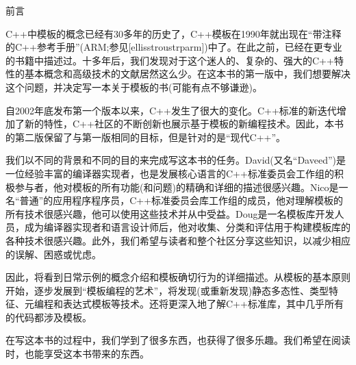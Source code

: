 
\begin{flushright}
 前言
\end{flushright}

C++中模板的概念已经有30多年的历史了，C++模板在1990年就出现在“带注释的C++参考手册”(ARM;参见[ellisstroustrparm])中了。在此之前，已经在更专业的书籍中描述过。十多年后，我们发现对于这个迷人的、复杂的、强大的C++特性的基本概念和高级技术的文献居然这么少。在这本书的第一版中，我们想要解决这个问题，并决定写一本关于模板的书(可能有点不够谦逊)。

自2002年底发布第一个版本以来，C++发生了很大的变化。C++标准的新迭代增加了新的特性，C++社区的不断创新也展示基于模板的新编程技术。因此，本书的第二版保留了与第一版相同的目标，但是针对的是“现代C++”。

我们以不同的背景和不同的目的来完成写这本书的任务。David(又名“Daveed”)是一位经验丰富的编译器实现者，也是发展核心语言的C++标准委员会工作组的积极参与者，他对模板的所有功能(和问题)的精确和详细的描述很感兴趣。Nico是一名“普通”的应用程序程序员，C++标准委员会库工作组的成员，他对理解模板的所有技术很感兴趣，他可以使用这些技术并从中受益。Doug是一名模板库开发人员，成为编译器实现者和语言设计师后，他对收集、分类和评估用于构建模板库的各种技术很感兴趣。此外，我们希望与读者和整个社区分享这些知识，以减少相应的误解、困惑或忧虑。

因此，将看到日常示例的概念介绍和模板确切行为的详细描述。从模板的基本原则开始，逐步发展到“模板编程的艺术”，将发现(或重新发现)静态多态性、类型特征、元编程和表达式模板等技术。还将更深入地了解C++标准库，其中几乎所有的代码都涉及模板。

在写这本书的过程中，我们学到了很多东西，也获得了很多乐趣。我们希望在阅读时，也能享受这本书带来的东西。